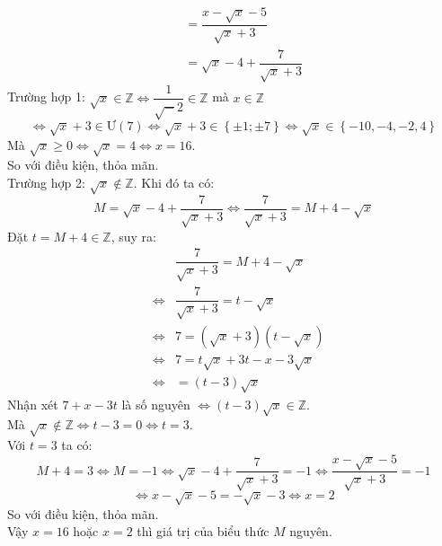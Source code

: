 \begin{bt}
{\begin{enumerate}
\begin{eqnarray*}
				& & = \dfrac{x - \sqrt x  - 5}{\sqrt x  + 3} \\
				& & = \sqrt x  - 4 + \dfrac{7}{\sqrt x  + 3}
			\end{eqnarray*}
			Trường hợp 1: $\sqrt x \in \mathbb{Z} \Leftrightarrow \dfrac{1}{\sqrt - 2} \in \mathbb{Z} $ mà $x \in \mathbb{Z} $ 
			$$\Leftrightarrow \sqrt x  + 3 \in \text{Ư}(7) \Leftrightarrow \sqrt x  + 3 \in \left\{  \pm 1; \pm 7 \right\}  \Leftrightarrow \sqrt x \in \left\{ -10, -4 , -2, 4 \right\} $$
			Mà $\sqrt x \ge 0 \Leftrightarrow \sqrt x = 4 \Leftrightarrow x = 16$.\\
			So với điều kiện, thỏa mãn.\\
			Trường hợp 2: $\sqrt x \not \in \mathbb{Z} $. Khi đó ta có:
			$$ M = \sqrt x  - 4 + \dfrac{7}{\sqrt x  + 3} \Leftrightarrow \dfrac{7}{\sqrt x  + 3} = M + 4 - \sqrt x $$
			Đặt $t = M + 4 \in \mathbb{Z} $, suy ra:
			\begin{eqnarray*}
				& & \dfrac{7}{\sqrt x  + 3} = M + 4 - \sqrt x \\
				& \Leftrightarrow & \dfrac{7}{\sqrt x  + 3} = t - \sqrt x \\
				& \Leftrightarrow & 7 = \left( \sqrt x  + 3 \right) \left( t - \sqrt x \right) \\
				& \Leftrightarrow & 7 = t \sqrt x  + 3t - x -3 \sqrt x \\
				& \Leftrightarrow &  = \left( t - 3 \right) \sqrt x
			\end{eqnarray*}
			Nhận xét $ 7 + x -3t $ là số nguyên $ \Leftrightarrow \left( t - 3 \right) \sqrt x \in \mathbb{Z} $.\\
			Mà $\sqrt x \not \in \mathbb{Z} \Leftrightarrow t - 3 = 0 \Leftrightarrow t = 3 $.\\
			Với $ t = 3 $ ta có:
			$$ M + 4  = 3 \Leftrightarrow M = -1 \Leftrightarrow \sqrt x  - 4 + \dfrac{7}{\sqrt x  + 3} = -1 \Leftrightarrow \dfrac{x - \sqrt x  - 5}{\sqrt x  + 3} = -1 $$
			$$ \Leftrightarrow x - \sqrt x  - 5 = - \sqrt x  - 3 \Leftrightarrow x = 2 $$
			So với điều kiện, thỏa mãn.\\
			Vậy $x = 16$ hoặc $x = 2 $ thì giá trị của biểu thức $M$ nguyên.
		\end{enumerate}	
	}
\end{bt}

